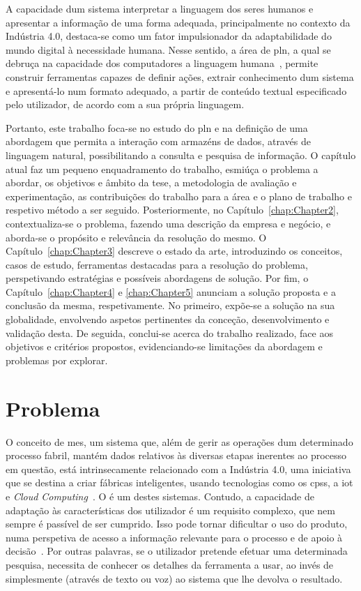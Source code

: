 A capacidade dum sistema interpretar a linguagem dos seres humanos e apresentar a informação de uma forma adequada, principalmente no contexto da Indústria 4.0, destaca-se como um fator impulsionador da adaptabilidade do mundo digital à necessidade humana. Nesse sentido, a área de \gls{pln}, a qual se debruça na capacidade dos computadores  a linguagem humana~\parencite[p.1]{applied_natural_language_processing_with_python}, permite construir ferramentas capazes de definir ações, extrair conhecimento dum sistema e apresentá-lo num formato adequado, a partir de conteúdo textual especificado pelo utilizador, de acordo com a sua própria linguagem. 

Portanto, este trabalho foca-se no estudo do \gls{pln} e na definição de uma abordagem que permita a interação com armazéns de dados, através de linguagem natural, possibilitando a consulta e pesquisa de informação. O capítulo atual faz um pequeno enquadramento do trabalho, esmiúça o problema a abordar, os objetivos e âmbito da tese, a metodologia de avaliação e experimentação, as contribuições do trabalho para a área e o plano de trabalho e respetivo método a ser seguido. Posteriormente, no Capítulo~\ref{chap:Chapter2}, contextualiza-se o problema, fazendo uma descrição da empresa e negócio, e aborda-se o propósito e relevância da resolução do mesmo. O Capítulo~\ref{chap:Chapter3} descreve o estado da arte, introduzindo os conceitos, casos de estudo, ferramentas destacadas para a resolução do problema, perspetivando estratégias e possíveis abordagens de solução. Por fim, o Capítulo~\ref{chap:Chapter4} e \ref{chap:Chapter5} anunciam a solução proposta e a conclusão da mesma, respetivamente. No primeiro, expõe-se a solução na sua globalidade, envolvendo aspetos pertinentes da conceção, desenvolvimento e validação desta. De seguida, conclui-se acerca do trabalho realizado, face aos objetivos e critérios propostos, evidenciando-se limitações da abordagem e problemas por explorar.

\section{Problema}
\label{sec:chap01_problem}
O conceito de \gls{mes}, um sistema que, além de gerir as operações dum determinado processo fabril, mantém dados relativos às diversas etapas inerentes ao processo em questão, está intrinsecamente relacionado com a Indústria 4.0, uma iniciativa que se destina a criar fábricas inteligentes, usando tecnologias como os \glspl{cps}, a \gls{iot} e \textit{Cloud Computing}~\parencite{intelligent_manufacturing_context_industry40_review}. O {\productname} é um destes sistemas. Contudo, a capacidade de adaptação às características dos utilizador é um requisito complexo, que nem sempre é passível de ser cumprido. Isso pode tornar dificultar o uso do produto, numa perspetiva de acesso a informação relevante para o processo e de apoio à decisão~\parencite{intelligent_manufacturing_context_industry40_review}. Por outras palavras, se o utilizador pretende efetuar uma determinada pesquisa, necessita de conhecer os detalhes da ferramenta a usar, ao invés de simplesmente  (através de texto ou voz) ao sistema que lhe devolva o resultado.

